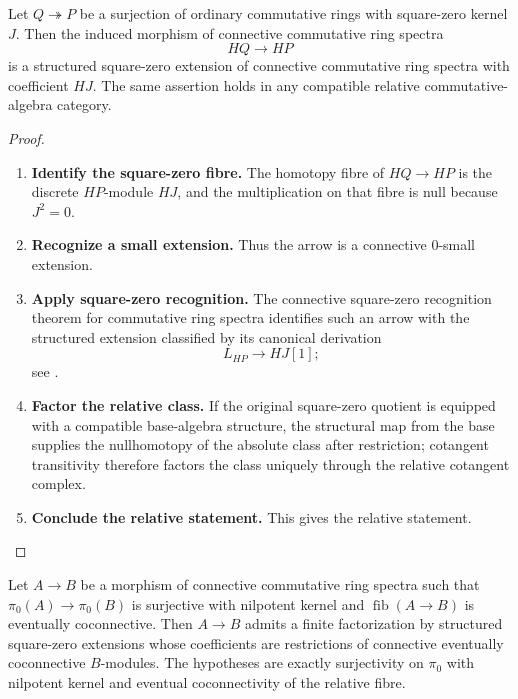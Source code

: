 \begin{lemma}
\label{lem:discrete-square-zero-structured}
Let \(Q\twoheadrightarrow P\) be a surjection of ordinary commutative rings
with square-zero kernel \(J\). Then the induced morphism of connective
commutative ring spectra
\[
    HQ\longrightarrow HP
\]
is a structured square-zero extension of connective commutative ring spectra with coefficient \(HJ\). The
same assertion holds in any compatible relative commutative-algebra category.
\end{lemma}

\begin{proof}
\leavevmode
\begin{enumerate}[label=\textup{(\arabic*)}]
    \item \textbf{Identify the square-zero fibre.}
    The homotopy fibre of \(HQ\to HP\) is the discrete \(HP\)-module \(HJ\), and
    the multiplication on that fibre is null because \(J^2=0\).
    \item \textbf{Recognize a small extension.}
    Thus the arrow is
    a connective \(0\)-small extension.
    \item \textbf{Apply square-zero recognition.}
    The connective square-zero recognition
    theorem for commutative ring spectra identifies such an arrow with the
    structured extension classified by its canonical derivation
    \[
        L_{HP}\longrightarrow HJ[1];
    \]
    see \cite{LurieDAGIV,LurieHigherAlgebra}.
    \item \textbf{Factor the relative class.}
    If the original square-zero quotient
    is equipped with a compatible base-algebra structure, the structural map from
    the base supplies the nullhomotopy of the absolute class after restriction;
    cotangent transitivity therefore factors the class uniquely through the
    relative cotangent complex.
    \item \textbf{Conclude the relative statement.}
    This gives the relative statement.
\end{enumerate}
\end{proof}

\begin{proposition}
\label{prop:bounded-nilpotent-square-zero-generation}
Let \(A\to B\) be a morphism of connective commutative ring spectra such that
\(\pi_0(A)\to\pi_0(B)\) is surjective with nilpotent kernel and
\(\operatorname{fib}(A\to B)\) is eventually coconnective. Then \(A\to B\)
admits a finite factorization by structured square-zero
extensions whose coefficients are restrictions of connective eventually
coconnective \(B\)-modules. The hypotheses are exactly surjectivity on \(\pi_0\) with nilpotent kernel
and eventual coconnectivity of the relative fibre.
\end{proposition}

